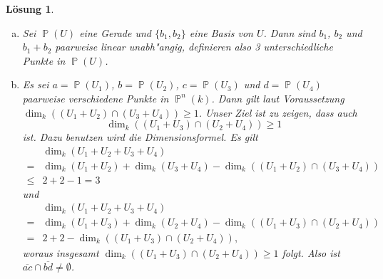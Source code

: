 \documentclass[a4paper, 12pt, numbers=noendperiod, chapterprefix=true]{scrbook}
\theoremstyle{break}
\newtheorem{Loes}{L\"osung}
\theoremstyle{nonumberbreak}
\theoremstyle{nonumberplain}
\newcommand{\A}{\mathbb{A}}
\DeclareMathOperator{\Projective}{\mathbb{P}} %
\begin{document}
\begin{Loes}
\begin{enumerate}[a)]
	Aus $a \neq b$ und $\dim_k(a) = \dim_k(b) = 1$ folgt, dass $a \cap b = \{0\}$. Mit der Dimensionsformel folgt dann $\dim_k(a+b) = 1+1-0 = 2$. $\Projective(a+b)$ ist also eine Gerade, die $a$ und $b$ enth"alt. Die Gerade ist eindeutig, da $a+b$ der kleinste Untervektorraum von $k^{n+1}$ ist, der sowohl $a$ als auch $b$ enth"alt und da $a+b$ schon Dimension $2$ hat.
\item
	Sei $\Projective(U)$ eine Gerade und $\{b_1,b_2\}$ eine Basis von $U$. Dann sind $b_1$, $b_2$ und $b_1+b_2$ paarweise linear unabh"angig, definieren also 3 unterschiedliche Punkte in $\Projective(U)$.
\item
	Es sei $a=\Projective(U_1)$, $b=\Projective(U_2)$, $c=\Projective(U_3)$ und $d=\Projective(U_4)$ paarweise verschiedene Punkte in $\Projective^n(k)$. Dann gilt laut Voraussetzung $\dim_k((U_1+U_2) \cap (U_3+U_4)) \geq 1$. Unser Ziel ist zu zeigen, dass auch 
		\[\dim_k((U_1+U_3) \cap (U_2+U_4)) \geq 1\]
	ist. Dazu benutzen wird die Dimensionsformel. Es gilt
		\[\begin{array}{cl}
			&\dim_k(U_1+U_2+U_3+U_4)\\
			=& \dim_k(U_1+U_2)+\dim_k(U_3+U_4)-\dim_k((U_1+U_2) \cap (U_3+U_4))\\
			\leq & 2 + 2 - 1 = 3
		\end{array}\]
	und
		\[\begin{array}{cl}
			&\dim_k(U_1+U_2+U_3+U_4) \\
			=& \dim_k(U_1+U_3)+\dim_k(U_2+U_4)-\dim_k((U_1+U_3) \cap (U_2+U_4))\\
			=& 2 + 2 - \dim_k((U_1+U_3) \cap (U_2+U_4)),
		\end{array}\]
	woraus insgesamt $\dim_k((U_1+U_3) \cap (U_2+U_4)) \geq 1$ folgt. Also ist $\overline{ac}\cap \overline{bd} \neq \emptyset$.
\end{enumerate}\end{Loes}

\setcounter{Loes}{2}
\end{document}
